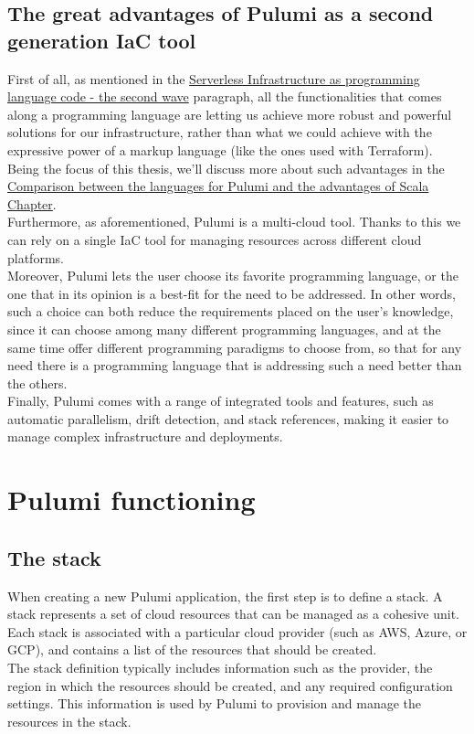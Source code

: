 \subsection{The great advantages of Pulumi as a second generation IaC tool}
First of all, as mentioned in the \hyperref[sssec:second-wave]{Serverless Infrastructure as programming language code - the second wave} paragraph, all the functionalities that comes along a programming language are letting us achieve more robust and powerful solutions for our infrastructure, rather than what we could achieve with the expressive power of a markup language (like the ones used with \gls{Terraform}).
Being the focus of this thesis, we'll discuss more about such advantages in the \hyperref[cap:comparison-between-languages]{Comparison between the languages for Pulumi and the advantages of Scala Chapter}.\\
Furthermore, as aforementioned, Pulumi is a multi-cloud tool. Thanks to this we can rely on a single IaC tool for managing resources across different cloud platforms.\\
Moreover, Pulumi lets the user choose its favorite programming language, or the one that in its opinion is a best-fit for the need to be addressed.
In other words, such a choice can both reduce the requirements placed on the user's knowledge, since it can choose among many different programming languages, 
and at the same time offer different programming paradigms to choose from, so that for any need there is a programming language that is addressing such a need better than the others.\\
Finally, Pulumi comes with a range of integrated tools and features, such as automatic parallelism, drift detection, and stack references, making it easier to manage complex infrastructure and deployments.

\section{Pulumi functioning}


\subsection{The stack}
When creating a new Pulumi application, the first step is to define a stack.
A stack represents a set of cloud resources that can be managed as a cohesive unit.
Each stack is associated with a particular cloud provider (such as AWS, Azure, or GCP), and contains a list of the resources that should be created.\\
The stack definition typically includes information such as the provider, the region in which the resources should be created, and any required configuration settings.
This information is used by Pulumi to provision and manage the resources in the stack.

